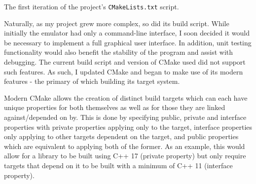 	\begin{listing}[h]
		\inputminted{cmake}{cmake/first.CMakeLists.txt}
		\caption{The first iteration of the project's \texttt{CMakeLists.txt} script.}
		\label{lst:cmake-first}
	\end{listing}




	Naturally, as my project grew more complex, so did its build script. While initially the emulator had only a command-line interface, I soon decided it would be necessary to implement a full graphical user interface. In addition, unit testing functionality would also benefit the stability of the program and assist with debugging. The current build script and version of CMake used did not support such features. As such, I updated CMake and began to make use of its modern features - the primary of which building its target system.

	Modern CMake allows the creation of distinct build targets which can each have unique properties for both themselves as well as for those they are linked against/depended on by. This is done by specifying public, private and interface properties with private properties applying only to the target, interface properties only applying to other targets dependent on the target, and public properties which are equivalent to applying both of the former. As an example, this would allow for a library to be built using C++ 17 (private property) but only require targets that depend on it to be built with a minimum of C++ 11 (interface property).

